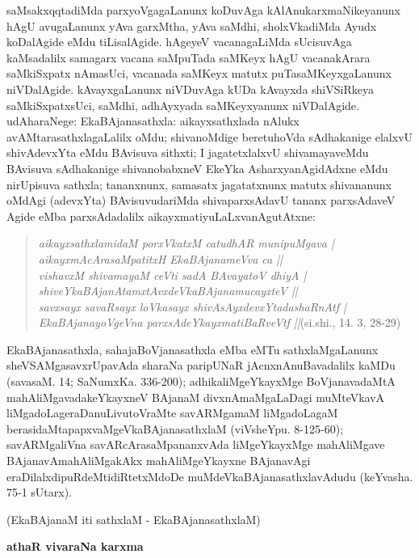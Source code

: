 saMsakxqqtadiMda parxyoVgagaLanunx koDuvAga kAlAnukarxmaNikeyanunx hAgU avugaLanunx yAva garxMtha, yAva saMdhi, sholxVkadiMda Ayudx koDalAgide eMdu tiLisalAgide. hAgeyeV vacanagaLiMda sUcisuvAga kaMsadalilx samagarx vacana \hbox{saMpuTada} saMKeyx hAgU vacanakArara saMkiSxpatx nAmasUci, vacanada saMKeyx matutx puTasaMKeyxgaLanunx niVDalAgide. kAvayx\-gaLanunx niVDuvAga kUDa kAvayxda shiVSiRkeya saMkiSxpatxsUci, saMdhi, adhAyxyada saMKeyxyanunx niVDalAgide. udAharaNege: Eka\-BAjanasathxla: aikayxsathxlada nAlukx avAMtarasathxlagaLalilx oMdu; shivanoMdige beretuhoVda sAdhakanige elalxvU shivAdevxYta eMdu BAvisuva sithxti; I jagatetxlalxvU shivamayaveMdu BAvisuva sAdhakanige shivanobabxneV EkeYka AsharxyanAgidAdxne eMdu nirUpisuva sathxla; tananxnunx, samasatx jagatatxnunx matutx shivananunx oMdAgi (adevxYta) BAvisuvudariMda shivaparxsAdavU tananx parxsAdaveV Agide eMba parxsAdadalilx aikayxmatiyuLaLxvanAgutAtxne:
\begin{quote}
{\sl aikayxsathxlamidaM porxVkatxM catudhAR munipuMgava |}\\[3pt]
{\sl aikayxmAcArasaMpatitxH EkaBAjanameVva ca ||}\\[5pt]
{\sl vishavxM shivamayaM ceVti sadA BAvayatoV dhiyA |}\\[3pt]
{\sl shiveYkaBAjanAtamxtAvxdeVkaBAjanamucayxteV ||}\\[5pt]
{\sl savxsayx savaRsayx loVkasayx shivAsAyxdevxYtadashaRnAtf |}\\[3pt]
{\sl EkaBAjanayoVgeVna parxsAdeYkayxmatiBaRveVtf ||}\hfill (si.shi., 14. 3, 28-29)
\end{quote}

\noindent
EkaBAjanasathxla, sahajaBoVjanasathxla eMba eMTu sathxlaM\-gaLanunx sheVSAMgasavxrUpavAda sharaNa paripUNaR jAcnxnAnuBavadalilx kaMDu (savasaM. 14; SaNumxKa. 336-200); adhikaliMgeY\-kayxMge BoVjanavadaMtA mahAliMgavadakeYkayxneV BAjanaM divxnAmaMgaLa\-Dagi muMteVkavA liMgadoLageraDanuLivutoVraMte savARMgamaM liMgadoLagaM berasidaMtapapxvaMgeVkaBAjanasathxlaM (viVsheYpu. 8-125-60); savARMga\-liVna savARcArasaMpananx\-vAda liMgeYkayxMge mahAliMgave BAjanavAmahAliMgakAkx mahAliMgeYkayxne BAjanavAgi eraDilalxdipuRdeMtidiR\-tetxMdoDe muMdeVkaBAjanasathxlavAdudu (keYvasha. 75-1 sUtarx).

\medskip
\noindent
(EkaBAjanaM iti sathxlaM - EkaBAjanasathxlaM)

\bigskip

\begin{center}
{\large\bf athaR vivaraNa karxma}
\end{center}

